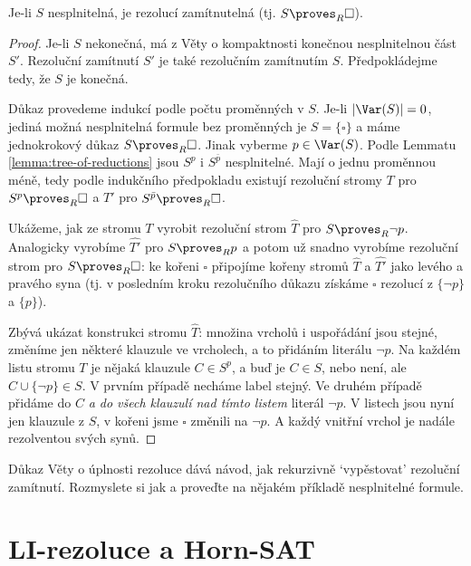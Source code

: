 \begin{theorem}
Je-li $S$ nesplnitelná, je rezolucí zamítnutelná (tj. $S\proves_R\square$).
\end{theorem}   
\begin{proof}
Je-li $S$ nekonečná, má z Věty o kompaktnosti konečnou nesplnitelnou část $S'$. Rezoluční zamítnutí $S'$ je také rezolučním zamítnutím $S$. Předpokládejme tedy, že $S$ je konečná. 

Důkaz provedeme indukcí podle počtu proměnných v $S$. Je-li $|\Var(S)|=0$, jediná možná nesplnitelná formule bez proměnných je $S=\{\square\}$ a máme jednokrokový důkaz $S\proves_R\square$. Jinak vyberme $p\in\Var(S)$. Podle Lemmatu \ref{lemma:tree-of-reductions} jsou $S^p$ i $S^{\bar p}$ nesplnitelné. Mají o jednu proměnnou méně, tedy podle indukčního předpokladu existují rezoluční stromy $T$ pro $S^p\proves_R\square$ a $T'$ pro $S^{\bar p}\proves_R\square$.

Ukážeme, jak ze stromu $T$ vyrobit rezoluční strom $\widehat T$ pro $S\proves_R \neg p$. Analogicky vyrobíme $\widehat{T'}$ pro $S\proves_R p$ a potom už snadno vyrobíme rezoluční strom pro $S\proves_R\square$: ke kořeni $\square$ připojíme kořeny stromů $\widehat T$ a $\widehat{T'}$ jako levého a pravého syna (tj. v posledním kroku rezolučního důkazu získáme $\square$ rezolucí z $\{\neg p\}$ a $\{p\}$).

Zbývá ukázat konstrukci stromu $\widehat T$: množina vrcholů i uspořádání jsou stejné, změníme jen některé klauzule ve vrcholech, a to přidáním literálu $\neg p$. Na každém listu stromu $T$ je nějaká klauzule $C\in S^p$, a buď je $C\in S$, nebo není, ale $C\cup\{\neg p\}\in S$. V prvním případě necháme label stejný. Ve druhém případě přidáme do $C$ \emph{a do všech klauzulí nad tímto listem} literál $\neg p$. V listech jsou nyní jen klauzule z $S$, v kořeni jsme $\square$ změnili na $\neg p$. A každý vnitřní vrchol je nadále rezolventou svých synů.
\end{proof}

\begin{exercise}
    Důkaz Věty o úplnosti rezoluce dává návod, jak rekurzivně `vypěstovat' rezoluční zamítnutí. Rozmyslete si jak a proveďte na nějakém příkladě nesplnitelné formule.
\end{exercise} %

\section{LI-rezoluce a Horn-SAT}

